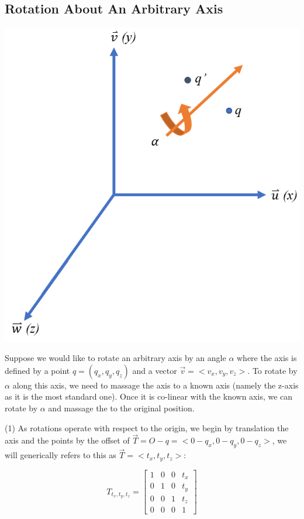 \documentclass[12pt,letterpaper]{article}
\begin{document}
\subsection{Rotation About An Arbitrary Axis}
\begin{center}
\includegraphics[scale=0.75]{rot1}
\end{center}

Suppose we would like to rotate an arbitrary axis by an angle $\alpha$ where the axis is defined by a point $q = (q_x, q_y, q_z)$ and a vector $\overrightarrow{v} = <v_x, v_y, v_z>$. To rotate by $\alpha$ along this axis, we need to massage the axis to a known axis (namely the z-axis as it is the most standard one). Once it is co-linear with the known axis, we can rotate by $\alpha$ and massage the to the original position.

(1) As rotations operate with respect to the origin, we begin by translation the axis and the points by the offset of $\overrightarrow{T} = O-q = <0-q_x, 0-q_y, 0-q_z>$, we will generically refers to this as $\overrightarrow{T} = <t_x, t_y, t_z>$:

\begin{equation}
    T_{t_x, t_y, t_z} =
     \begin{bmatrix}
        1 & 0 & 0 & t_x \\
        0 & 1 & 0 & t_y \\
        0 & 0 & 1 & t_z \\
        0 & 0 & 0 & 1
    \end{bmatrix}
\end{equation}
\end{document}

